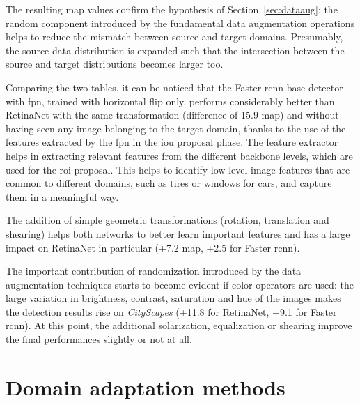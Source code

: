 \documentclass[%
    corpo=12pt,
    twoside,
    stile=classica,   
    tipotesi=magistrale,
    evenboxes,
    english,
	numerazioneromana,
]{toptesi}
\begin{document}
\bigskip
The resulting \gls{map} values confirm the hypothesis of Section~\ref{sec:dataaug}: the random component introduced by the fundamental data augmentation operations helps to reduce the mismatch between source and target domains. Presumably, the source data distribution is expanded such that the intersection between the source and target distributions becomes larger too.

\bigskip
Comparing the two tables, it can be noticed that the Faster \gls{rcnn} base detector with \gls{fpn}, trained with horizontal flip only, performs considerably better than RetinaNet with the same transformation (difference of 15.9 \gls{map}) and without having seen any image belonging to the target domain, thanks to the use of the features extracted by the \gls{fpn} in the \gls{iou} proposal phase. The feature extractor helps in extracting relevant features from the different backbone levels, which are used for the \gls{roi} proposal. This helps to identify low-level image features that are common to different domains, such as tires or windows for cars, and capture them in a meaningful way.

\medskip
The addition of simple geometric transformations (rotation, translation and shearing) helps both networks to better learn important features and has a large impact on RetinaNet in particular (+7.2 \gls{map}, +2.5 for Faster \gls{rcnn}).


\medskip
The important contribution of randomization introduced by the data augmentation techniques starts to become evident if color operators are used: the large variation in brightness, contrast, saturation and hue of the images makes the detection results rise on \textit{CityScapes} (+11.8 for RetinaNet, +9.1 for Faster \gls{rcnn}). At this point, the additional solarization, equalization or shearing improve the final performances slightly or not at all.

\section{Domain adaptation methods}
\end{document}
